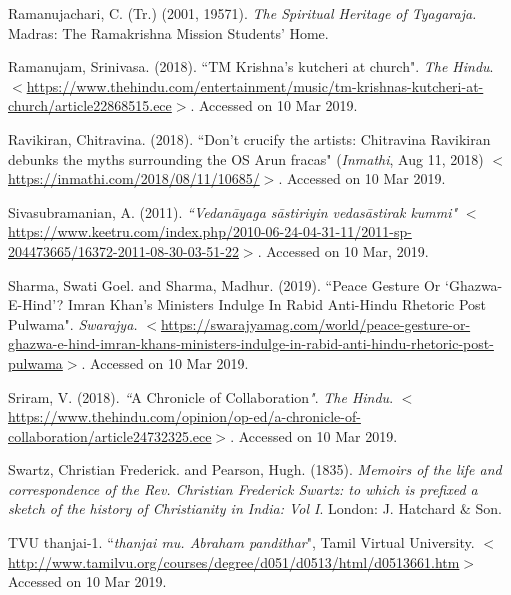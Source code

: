 \begin{thebibliography}{99}
  Ramanujachari, C. (Tr.) (2001, 19571). \textit{The Spiritual Heritage of Tyagaraja. }Madras: The Ramakrishna Mission Students' Home.

  Ramanujam, Srinivasa. (2018). ``TM Krishna's kutcheri at church". \textit{The Hindu}. $<$\url{https://www.thehindu.com/entertainment/music/tm-krishnas-kutcheri-at-church/article22868515.ece}$>$. Accessed on 10 Mar 2019.

  Ravikiran, Chitravina. (2018). ``Don't crucify the artists: Chitravina Ravikiran debunks the myths surrounding the OS Arun fracas" (\textit{Inmathi}, Aug 11, 2018) $<$\url{https://inmathi.com/2018/08/11/10685/}$>$. Accessed on 10 Mar 2019.

  Sivasubramanian, A. (2011). \textit{``Vedanāyaga sāstiriyin vedasāstirak kummi"} $<$\url{https://www.keetru.com/index.php/2010-06-24-04-31-11/2011-sp-204473665/16372-2011-08-30-03-51-22}$>$. Accessed on 10 Mar, 2019.

  Sharma, Swati Goel. and Sharma, Madhur. (2019). ``Peace Gesture Or `Ghazwa-E-Hind'? Imran Khan's Ministers Indulge In Rabid Anti-Hindu Rhetoric Post Pulwama". \textit{Swarajya.} $<$\url{https://swarajyamag.com/world/peace-gesture-or-ghazwa-e-hind-imran-khans-ministers-indulge-in-rabid-anti-hindu-rhetoric-post-pulwama}$>$. Accessed on 10 Mar 2019.

  Sriram, V. (2018). \textit{``}A Chronicle of Collaboration\textit{"}. \textit{The Hindu}. $<$\url{https://www.thehindu.com/opinion/op-ed/a-chronicle-of-collaboration/article24732325.ece}$>$. Accessed on 10 Mar 2019.

  Swartz, Christian Frederick. and Pearson, Hugh. (1835). \textit{Memoirs of the life and correspondence of the Rev. Christian Frederick Swartz: to which is prefixed a sketch of the history of Christianity in India: Vol I}. London: J. Hatchard \& Son.

  TVU thanjai-1. ``\textit{thanjai mu. Abraham pandithar}", Tamil Virtual University. $<$\url{http://www.tamilvu.org/courses/degree/d051/d0513/html/d0513661.htm}$>$ Accessed on 10 Mar 2019.

 \end{thebibliography}

\theendnotes
\label{endchapter5}



